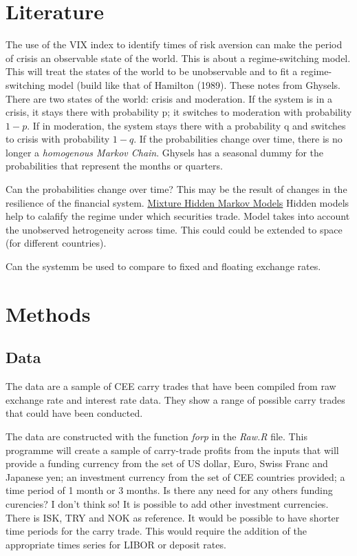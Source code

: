 \documentclass[12pt, a4paper, oneside]{article} %
\begin{document}
\section{Literature}
The use of the VIX index to identify times of risk aversion can make the period of crisis an observable state of the world. This is about a regime-switching model. This will treat the states of the world to be unobservable and to fit a regime-switching model (build like that of Hamilton (1989).  These notes from Ghysels.  There are two states of the world:  crisis and moderation.  If the system is in a crisis, it stays there with probability p; it switches to moderation with probability $1-p$.  If in moderation, the system stays there with a probability q and switches to crisis with probability $1-q$.  If the probabilities change over time, there is no longer a \emph{homogenous Markov Chain}. Ghysels has a seasonal dummy for the probabilities that represent the months or quarters.  

Can the probabilities change over time?  This may be the result of changes in the resilience of the financial system. 
\href{http://members.home.nl/jeroenvermunt/dias2010.pdf}{Mixture Hidden Markov Models} Hidden models help to calafify the regime under which securities trade. Model takes into account the unobserved hetrogeneity across time. This could could be extended to space (for different countries).  

Can the systemm be used to compare to fixed and floating exchange rates. 

\section{Methods}
\subsection{Data}
The data are a sample of CEE carry trades that have been compiled from raw exchange rate and interest rate data.  They show a range of possible carry trades that could have been conducted. 

The data are constructed with the function \emph{forp} in the \emph{Raw.R} file. This programme will create a sample of carry-trade profits from the inputs that will provide a funding currency from the set of US dollar, Euro, Swiss Franc and Japanese yen; an investment currency from the set of CEE countries provided; a time period of 1 month or 3 months.  Is there any need for any others funding curencies?  I don't think so!   It is possible to add other investment currencies.  There is ISK, TRY and NOK as reference.  It would be possible to have shorter time periods for the carry trade.   This would require the addition of the appropriate times series for LIBOR or deposit rates.  
\end{document}
